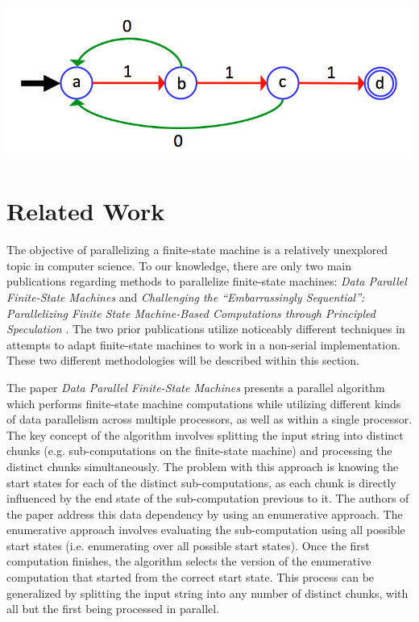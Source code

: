 \documentclass[11pt]{sigplanconf}
\newenvironment{Figure} %
  {\par\medskip\noindent\minipage{\linewidth}}
  {\endminipage\par\medskip}
\begin{document}
\begin{Figure}
\centering
\includegraphics[width=\linewidth]{fsm_diagram.png}
\label{fig:Example FSM}
\end{Figure}
 
\section{Related Work}
 
The objective of parallelizing a finite-state machine is a relatively unexplored topic in computer science. To our knowledge, there are only two main publications regarding methods to parallelize finite-state machines: \textit{Data Parallel Finite-State Machines} \cite{microsoft} and \textit{Challenging the ``Embarrassingly Sequential'': Parallelizing Finite State Machine-Based Computations through Principled Speculation} \cite{william_and_mary}. The two prior publications utilize noticeably different techniques in attempts to adapt finite-state machines to work in a non-serial implementation. These two different methodologies will be described within this section.

The paper \textit{Data Parallel Finite-State Machines} \cite{microsoft} presents a parallel algorithm which performs finite-state machine computations while utilizing different kinds of data parallelism across multiple processors, as well as within a single processor. The key concept of the algorithm involves splitting the input string into distinct chunks (e.g. sub-computations on the finite-state machine) and processing the distinct chunks simultaneously. The problem with this approach is knowing the start states for each of the distinct sub-computations, as each chunk is directly influenced by the end state of the sub-computation previous to it. The authors of the paper address this data dependency by using an enumerative approach. The enumerative approach involves evaluating the sub-computation using all possible start states (i.e. enumerating over all possible start states). Once the first computation finishes, the algorithm selects the version of the enumerative computation that started from the correct start state. This process can be generalized by splitting the input string into any number of distinct chunks, with all but the first being processed in parallel.
\end{document}
